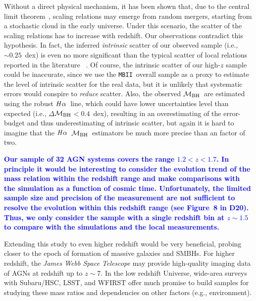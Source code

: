 \documentclass[twocolumn,trackchanges]{aastex63}
\newcommand{\mbh}{$\mathcal M_{\rm BH}$}
\newcommand{\halpha}{${\it H}\alpha$}
\newcommand{\mbii}{\texttt{MBII}}
\newcommand{\blue}[1]{{\textcolor{blue}{\bf #1}}}
\begin{document}
Without a direct physical mechanism, it has been shown that, due to the central limit theorem~\citep{Peng2007, Jahnke2011, Hirschmann2010}, scaling relations may emerge from random mergers, starting from a stochastic cloud in the early universe. Under this scenario, the scatter of the scaling relations has to increase with redshift. Our observations contradict this hypothesis. In fact, the inferred {\it intrinsic} scatter of our observed sample (i.e., $\sim0.25$~dex) is even no more significant than the typical scatter of local relations reported in the literature ~\citep[][i.e., $\gtrsim0.35$~dex]{Kormendy13, Gul++09, Reines2015}. Of course, the intrinsic scatter of our high-$z$ sample could be inaccurate, since we use the \mbii\ overall sample as a proxy to estimate the level of intrinsic scatter for the real data, but it is unlikely that systematic errors would conspire to {\it reduce} scatter.
Also, the observed \mbh\ are estimated using the robust \halpha\ line, which could have lower uncertainties level than expected (i.e., $\Delta$\mbh$<0.4$~dex), resulting in an overestimating of the error-budget and thus underestimating of intrinsic scatter, but again it is hard to imagine that the \halpha\ \mbh\ estimators be much more precise than an factor of two.

\blue{Our sample of 32 AGN systems covers the range $1.2<z<1.7$. In principle it would be interesting to consider the evolution trend of the mass relation within the redshift range and make comparisons with the simulation as a function of cosmic time. Unfortunately, the limited sample size and precision of the measurement are not sufficient to resolve the evolution within this redshift range (see Figure~8 in D20). Thus, we only consider the sample with a single redshift bin at $z\sim1.5$ to compare with the simulations and the local measurements.}

Extending this study to even higher redshift would be very beneficial, probing closer to the epoch of formation of massive galaxies and SMBHs. For higher redshift, the {\it James Webb Space Telescope} may provide high-quality imaging data of AGNs at redshift up to $z\sim7$. In the low redshift Universe, wide-area surveys with Subaru/HSC, LSST, and WFIRST offer much promise to build samples for studying these mass ratios and dependencies on other factors (e.g., environment).

\end{document}
